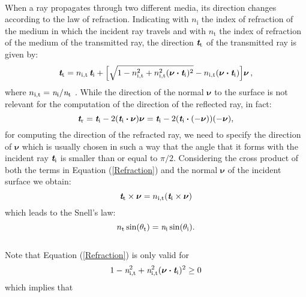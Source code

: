 \\ When a ray propagates through two different media, its direction changes according to the law of refraction. 
Indicating with $n_\textrm{i}$ the index of refraction of the medium in which the incident ray travels and with 
$n_\textrm{t}$ the index of refraction of the medium of the transmitted ray, the direction $\textit{\textbf{t}}_\textrm{t}$ of the transmitted ray is given by:
\begin{equation}\label{Refraction}
\textit{\textbf{t}}_\textrm{t} = n_{\textrm{i},\textrm{t}}\,\textit{\textbf{t}}_\textrm{i}+
\Big[\sqrt{1-n_{\textrm{i},\textrm{t}}^2+
n_{\textrm{i},\textrm{t}}^2(\boldsymbol{\nu}\boldsymbol{\cdot}\textit{\textbf{t}}_\textrm{i})^2}
-n_{\textrm{i},\textrm{t}}(\boldsymbol{\nu}\boldsymbol{\cdot}\textit{\textbf{t}}_\textrm{i}) \Big]\boldsymbol{\nu}\,,
\end{equation}
where $n_{\textrm{i},\textrm{t}}=\textit{n}_\textrm{i}/\textit{n}_\textrm{t}$ \cite{chaves2015introduction}.
While the direction of the normal $\boldsymbol{\nu}$ to the surface is not relevant for the computation of the direction of the reflected ray, in fact:
\begin{equation}
\textit{\textbf{t}}_\textrm{r} = \textit{\textbf{t}}_\textrm{i}-2(\textit{\textbf{t}}_\textrm{i}\boldsymbol{\cdot}\boldsymbol{\nu})\boldsymbol{\nu}= \textit{\textbf{t}}_\textrm{i}-2(\textit{\textbf{t}}_\textrm{i}\boldsymbol{\cdot}(-\boldsymbol{\nu}))(-\boldsymbol{\nu}), 
\end{equation}
for computing the direction of the refracted ray, we need to specify the direction of $\boldsymbol{\nu}$ which is usually chosen in such a way that the angle that it forms with the incident ray $\textit{\textbf{t}}_\textrm{i}$ is smaller than or equal to $\pi/2$. 
Considering the cross product of both the terms in Equation (\ref{Refraction}) and the normal $\boldsymbol{\nu}$ of the incident surface we obtain:
\begin{equation}
\textit{\textbf{t}}_\textrm{t}\times\boldsymbol{\nu} = n_{\textrm{i},\textrm{t}}(\textit{\textbf{t}}_\textrm{i}\times\boldsymbol{\nu})
\end{equation}
which leads to the Snell's law:
\begin{equation}\label{eq:snell}
n_\textrm{t}\sin(\theta_\textrm{t}) = \textit{n}_\textrm{i}\sin(\theta_\textrm{i}).
\end{equation}
\\\indent
Note that Equation (\ref{Refraction}) is only valid for 
\begin{equation}\label{tir}
1-\textit{n}_{\textrm{i},\textrm{t}}^2+\textit{n}_{\textrm{i},\textrm{t}}^2(\boldsymbol{\nu}\boldsymbol{\cdot}\textit{\textbf{t}}_\textrm{i})^2\geq 0 
\end{equation} which implies that
